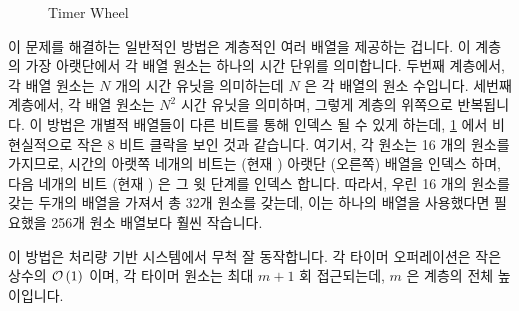 \begin{figure}[tb]
\centering
{}
\caption{Timer Wheel}
\label{fig:advsync:Timer Wheel}
\end{figure}

이 문제를 해결하는 일반적인 방법은 계층적인 여러 배열을 제공하는 겁니다.
이 계층의 가장 아랫단에서 각 배열 원소는 하나의 시간 단위를 의미합니다.
두번째 계층에서, 각 배열 원소는 $N$ 개의 시간 유닛을 의미하는데 $N$ 은 각
배열의 원소 수입니다.
세번째 계층에서, 각 배열 원소는 $N^2$ 시간 유닛을 의미하며, 그렇게 계층의
위쪽으로 반복됩니다.
이 방법은 개별적 배열들이 다른 비트를 통해 인덱스 될 수 있게 하는데,
\cref{fig:advsync:Timer Wheel} 에서 비현실적으로 작은 8 비트 클락을 보인 것과
같습니다.
여기서, 각 원소는 16 개의 원소를 가지므로, 시간의 아랫쪽 네개의 비트는 (현재
) 아랫단 (오른쪽) 배열을 인덱스 하며, 다음 네개의 비트 (현재 )
은 그 윗 단계를 인덱스 합니다.
따라서, 우린 16 개의 원소를 갖는 두개의 배열을 가져서 총 32개 원소를 갖는데,
이는 하나의 배열을 사용했다면 필요했을 256개 원소 배열보다 훨씬 작습니다.

이 방법은 처리량 기반 시스템에서 무척 잘 동작합니다.
각 타이머 오퍼레이션은 작은 상수의 $\mathcal{O}\left(1\right)$ 이며, 각 타이머 원소는 최대 $m+1$ 회
접근되는데, $m$ 은 계층의 전체 높이입니다.

